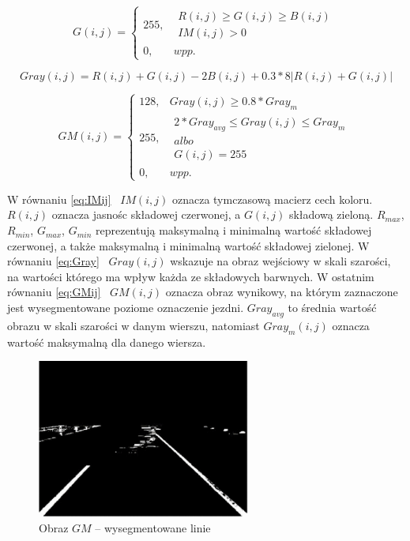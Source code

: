 \begin{equation}
\label{eq:Gij}
G(i,j)=\left\{\begin{matrix}
255, & \begin{matrix}
R(i,j)\geq G(i,j) \geq B(i,j)\\ 
IM(i,j)>0
\end{matrix}\\ 
0, & wpp.
\end{matrix}\right.
\end{equation}

\begin{equation}
\label{eq:Gray}
Gray(i,j)=R(i,j)+G(i,j)-2B(i,j)+0.3*8|R(i,j)+G(i,j)|
\end{equation}

\begin{equation}
\label{eq:GMij}
GM(i,j)=\left\{\begin{matrix}
128, &  Gray(i,j)\geq 0.8*Gray_{m} \\ 
255, & \begin{matrix}
2*Gray_{avg} \leq Gray(i, j) \leq Gray_{m}\\albo\\ 
G(i,j)=255
\end{matrix} \\ 
0,   & wpp.
\end{matrix}\right.
\end{equation}

W równaniu \eqref{eq:IMij} \ ${IM(i,j)}$ oznacza tymczasową macierz cech koloru. ${R(i,j)}$ oznacza jasnośc składowej czerwonej, a ${G(i,j)}$ składową zieloną. ${R_{max}}$, ${R_{min}}$, ${G_{max}}$, ${G_{min}}$ reprezentują maksymalną i minimalną wartość składowej czerwonej, a także maksymalną i minimalną wartość składowej zielonej. W równaniu \eqref{eq:Gray} \ $ Gray(i,j)$ wskazuje na obraz wejściowy w skali szarości, na wartości którego ma wpływ każda ze składowych barwnych. W ostatnim równaniu \eqref{eq:GMij} \ $GM(i,j)$ oznacza obraz wynikowy, na którym zaznaczone jest wysegmentowane poziome oznaczenie jezdni. $Gray_{avg}$ to średnia wartość obrazu w skali szarości w danym wierszu, natomiast $Gray_{m}(i,j)$ oznacza wartość maksymalną dla danego wiersza.

\begin{figure}
  \centering
  \includegraphics[width=7cm]{img/segmentacja.png}
  \caption{Obraz $GM$ -- wysegmentowane linie\cite{T3}}
  \label{fig:segmented}
\end{figure}


